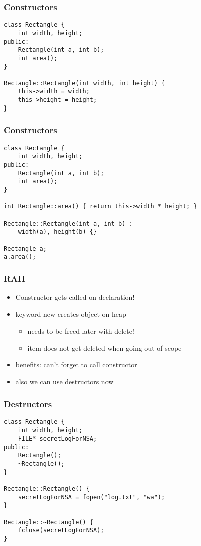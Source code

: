 \begin{frame}[fragile]
    \frametitle{Constructors}
    \begin{lstlisting}
class Rectangle {
    int width, height;
public:
    Rectangle(int a, int b);
    int area();
}

Rectangle::Rectangle(int width, int height) {
    this->width = width;
    this->height = height;
}
    \end{lstlisting}
\end{frame}

\begin{frame}[fragile]
    \frametitle{Constructors}
    \begin{lstlisting}
class Rectangle {
    int width, height;
public:
    Rectangle(int a, int b);
    int area();
}

int Rectangle::area() { return this->width * height; }

Rectangle::Rectangle(int a, int b) :
    width(a), height(b) {}

Rectangle a;
a.area();
    \end{lstlisting}
\end{frame}

\begin{frame}[fragile]
    \frametitle{RAII}
    \begin{itemize}
        \item Constructor gets called on declaration!
        \item keyword new creates object on heap
        \begin{itemize}
            \item needs to be freed later with delete!
            \item item does not get deleted when going out of scope
        \end{itemize}
        \item benefits: can't forget to call constructor
        \item also we can use destructors now
    \end{itemize}
\end{frame}

\begin{frame}[fragile]
    \frametitle{Destructors}
    \begin{lstlisting}
class Rectangle {
    int width, height;
    FILE* secretLogForNSA;
public:
    Rectangle();
    ~Rectangle();
}

Rectangle::Rectangle() {
    secretLogForNSA = fopen("log.txt", "wa");
}

Rectangle::~Rectangle() {
    fclose(secretLogForNSA);
}
    \end{lstlisting}
\end{frame}

